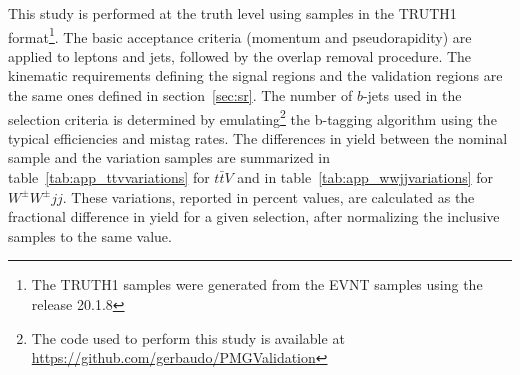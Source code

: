 This study is performed at the truth level using samples in the {\sc
  TRUTH1} format\footnote{The {\sc TRUTH1} samples were generated from
  the {\sc EVNT} samples using the release 20.1.8}.  The basic
acceptance criteria (momentum and pseudorapidity) are applied to
leptons and jets, followed by the overlap removal procedure. The
kinematic requirements defining the signal regions and the validation
regions are the same ones defined in section~\ref{sec:sr}. The number
of $b$-jets used in the selection criteria is determined by
emulating\footnote{The code used to perform this study is available at
  \url{https://github.com/gerbaudo/PMGValidation}} the b-tagging
algorithm using the typical efficiencies and mistag rates.  The
differences in yield between the nominal sample and the variation
samples are summarized in table~\ref{tab:app_ttvvariations} for
$t\bar{t}V$ and in table~\ref{tab:app_wwjjvariations} for
$W^\pm{}W^\pm{}jj$. These variations, reported in percent values, are
calculated as the fractional difference in yield for a given
selection, after normalizing the inclusive samples to the same value.

